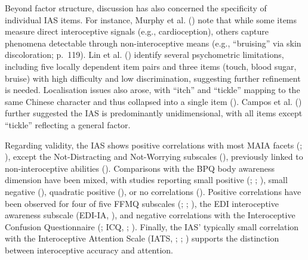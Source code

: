 \documentclass[
  jou,
  floatsintext,
  longtable,
  nolmodern,
  notxfonts,
  notimes,
  colorlinks=true,linkcolor=blue,citecolor=blue,urlcolor=blue]{apa7}
\begin{document}
Beyond factor structure, discussion has also concerned the specificity
of individual IAS items. For instance, Murphy et al.
() note that while some items measure
direct interoceptive signals (e.g., cardioception), others capture
phenomena detectable through non-interoceptive means (e.g., ``bruising''
via skin discoloration; p.~119). Lin et al.
() identify several psychometric
limitations, including five locally dependent item pairs and three items
(touch, blood sugar, bruise) with high difficulty and low
discrimination, suggesting further refinement is needed. Localisation
issues also arose, with ``itch'' and ``tickle'' mapping to the same
Chinese character and thus collapsed into a single item
(). Campos et al.
() further suggested the IAS is
predominantly unidimensional, with all items except ``tickle''
reflecting a general factor.

Regarding validity, the IAS shows positive correlations with most MAIA
facets (;
),
except the Not-Distracting and Not-Worrying subscales
(), previously linked to
non-interoceptive abilities
().
Comparisons with the BPQ body awareness dimension have been mixed, with
studies reporting small positive (; ;
), small negative
(), quadratic positive
(), or no correlations
(). Positive correlations
have been observed for four of five FFMQ subscales
(;
;
), the EDI interoceptive
awareness subscale (EDI-IA, ),
and negative correlations with the Interoceptive Confusion Questionnaire
(; ICQ,
;
). Finally, the IAS'
typically small correlation with the Interoceptive Attention Scale
(IATS, ;
;
) supports the distinction
between interoceptive accuracy and attention.
\end{document}
